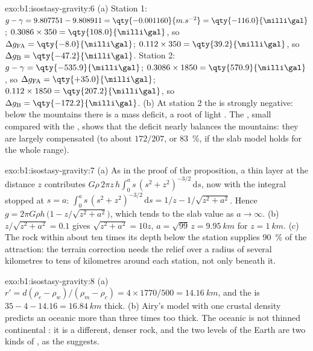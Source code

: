 \begin{solution}{exo:b1:isostasy-gravity:6}
(a) Station 1: $g - \gamma = 9.807751 - 9.808911 = \qty{-0.001160}{m.s^{-2}} =
\qty{-116.0}{\milli\gal}$;  $0.3086\times350 =
\qty{108.0}{\milli\gal}$, so $\Delta g_{\mathrm{FA}} = \qty{-8.0}{\milli\gal}$;
 $0.112\times350 = \qty{39.2}{\milli\gal}$, so
$\Delta g_{\mathrm B} = \qty{-47.2}{\milli\gal}$.
Station 2: $g - \gamma = \qty{-535.9}{\milli\gal}$; 
$0.3086\times1850 = \qty{570.9}{\milli\gal}$, so $\Delta g_{\mathrm{FA}} =
\qty{+35.0}{\milli\gal}$;  $0.112\times1850 =
\qty{207.2}{\milli\gal}$, so $\Delta g_{\mathrm B} = \qty{-172.2}{\milli\gal}$.
(b) At station 2 the  is strongly negative: below the mountains
there is a mass deficit, a root of light . The , small
compared with the , shows that the deficit nearly balances
the mountains: they are largely compensated (to about $172/207$, or
\qty{83}{\percent}, if the slab model holds for the whole range).
\end{solution}

\begin{solution}{exo:b1:isostasy-gravity:7}
(a) As in the proof of the proposition, a thin layer at the distance $z$
contributes $G\rho\,2\pi z\,h\int_0^a s\,(s^2 + z^2)^{-3/2}\,\mathrm ds$, now
with the integral stopped at $s = a$:
$\int_0^a s\,(s^2 + z^2)^{-3/2}\,\mathrm ds = 1/z - 1/\sqrt{z^2 + a^2}$. Hence
$g = 2\pi G\rho h\,\bigl(1 - z/\sqrt{z^2 + a^2}\bigr)$, which tends to the slab
value as $a \to \infty$. (b) $z/\sqrt{z^2 + a^2} = 0.1$ gives
$\sqrt{z^2 + a^2} = 10z$, $a = \sqrt{99}\,z = \qty{9.95}{km}$ for
$z = \qty{1}{km}$. (c) The rock within about ten times its depth below the
station supplies \qty{90}{\percent} of the attraction: the terrain correction
needs the relief over a radius of several kilometres to tens of kilometres
around each station, not only beneath it.
\end{solution}

\begin{solution}{exo:b1:isostasy-gravity:8}
(a) $r' = d(\rho_c - \rho_w)/(\rho_m - \rho_c) = 4\times1770/500 =
\qty{14.16}{km}$, and the  is $35 - 4 - 14.16 = \qty{16.84}{km}$ thick.
(b) Airy's model with one crustal density predicts an oceanic  more than
three times too thick. The oceanic  is not thinned continental : it
is a different, denser rock, and the two levels of the Earth are two kinds of
, as the  suggests.
\end{solution}

